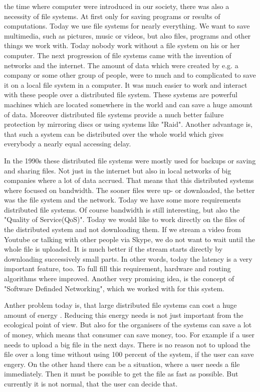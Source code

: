  the time where computer were introduced in our society, there was also a necessity of file systems. At first only for saving programs or results of computations. Today we use file systems for nearly everything. We want to save multimedia, such as pictures, music or videos, but also files, programs and other things we work with. Today nobody work without a file system on his or her computer. The next progression of file systems came with the invention of networks and the internet. The amount of data which were created by e.g. a company or some other group of people, were to much and to complicated to save it on a local file system in a computer. It was much easier to work and interact with these people over a distributed file system. These systems are powerful machines which are located somewhere in the world and can save a huge amount of data. Moreover distributed file systems provide a much better failure protection by mirroring discs or using systems like "Raid". Another advantage is, that such a system can be distributed over the whole world which gives everybody a nearly equal accessing delay. 

In the 1990s these distributed file systems were mostly used for backups or saving and sharing files. Not just in the internet but also in local networks of big companies where a lot of data accrued. That means that this distributed systems where focused on bandwidth. The sooner files were up- or downloaded, the better was the file system and the network. Today we have some more requirements distributed file systems. Of course bandwidth is still interesting, but also the "Quality of Service(QoS)". Today we would like to work directly on the files of the distributed system and not downloading them. If we stream a video from Youtube or talking with other people via Skype, we do not want to wait until the whole file is uploaded. It is much better if the stream starts directly by downloading successively small parts. In other words, today the latency is a very important feature, too. To full fill this requirement, hardware and routing algorithms where improved. Another very promising idea, is the concept of "Software Definded Networking", which we worked with for this system.

Anther problem today is, that large distributed file systems can cost a huge amount of energy . Reducing this energy needs is not just important from the ecological point of view. But also for the organisers of the systems can save a lot of money, which means that consumer can save money, too. For example if a user needs to upload a big file in the next days. There is no reason not to upload the file over a long time without using 100 percent of the system, if the user can save engery. On the other hand there can be a situation, where a user needs a file immediately. Then it must be possible to get the file as fast as possible. But currently it is not normal, that the user can decide that.  

